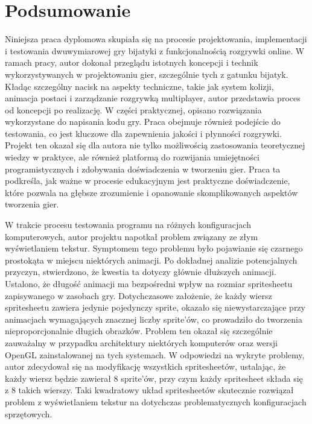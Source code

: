 \chapter{Podsumowanie}
Niniejsza praca dyplomowa skupiała się na procesie projektowania, implementacji i testowania dwuwymiarowej gry bijatyki z funkcjonalnością rozgrywki online. W ramach pracy, autor dokonał przeglądu istotnych koncepcji i technik wykorzystywanych w projektowaniu gier, szczególnie tych z gatunku bijatyk. Kładąc szczególny nacisk na aspekty techniczne, takie jak system kolizji, animacja postaci i zarządzanie rozgrywką multiplayer, autor przedstawia proces od koncepcji po realizację. W części praktycznej, opisano rozwiązania wykorzystane do napisania kodu gry. Praca obejmuje również podejście do testowania, co jest kluczowe dla zapewnienia jakości i płynności rozgrywki. Projekt ten okazał się dla autora nie tylko możliwością zastosowania teoretycznej wiedzy w praktyce, ale również platformą do rozwijania umiejętności programistycznych i zdobywania doświadczenia w tworzeniu gier. Praca ta podkreśla, jak ważne w procesie edukacyjnym jest praktyczne doświadczenie, które pozwala na głębsze zrozumienie i opanowanie skomplikowanych aspektów tworzenia gier.

W trakcie procesu testowania programu na różnych konfiguracjach komputerowych, autor projektu napotkał problem związany ze złym wyświetlaniem tekstur. Symptomem tego problemu było pojawianie się czarnego prostokąta w miejscu niektórych animacji. Po dokładnej analizie potencjalnych przyczyn, stwierdzono, że kwestia ta dotyczy głównie dłuższych animacji. Ustalono, że długość animacji ma bezpośredni wpływ na rozmiar spritesheetu zapisywanego w zasobach gry. Dotychczasowe założenie, że każdy wiersz spritesheetu zawiera jedynie pojedynczy sprite, okazało się niewystarczające przy animacjach wymagających znacznej liczby sprite'ów, co prowadziło do tworzenia nieproporcjonalnie długich obrazków. Problem ten okazał się szczególnie zauważalny w przypadku architektury niektórych komputerów oraz wersji OpenGL zainstalowanej na tych systemach. W odpowiedzi na wykryte problemy, autor zdecydował się na modyfikację wszystkich spritesheetów, ustalając, że każdy wiersz będzie zawierał 8 sprite'ów, przy czym każdy spritesheet składa się z 8 takich wierszy. Taki kwadratowy układ spritesheetów skutecznie rozwiązał problem z wyświetlaniem tekstur na dotychczas problematycznych konfiguracjach sprzętowych.

